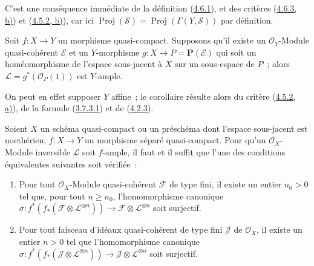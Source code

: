 C'est une conséquence immédiate de la définition
(\hyperref[II.4.6.1-fr]{4.6.1}), et des critères
(\hyperref[II.4.6.3-fr]{4.6.3, b)}) et
(\hyperref[II.4.5.2-fr]{4.5.2, b)}), car ici
$\operatorname{Proj}(\mathcal{S})
=\operatorname{Proj}(\Gamma(Y,\mathcal{S}))$ par définition.

\begin{corollary}[4.6.7]
\label{II.4.6.7-fr}
Soit $f:X\to Y$ un morphisme quasi-compact. Supposons qu'il existe un
$\mathcal{O}_Y$-Module quasi-cohérent $\mathcal{E}$ et un $Y$-morphisme
$g:X\to P=\mathbf{P}(\mathcal{E})$ qui soit un homéomorphisme de l'espace
sous-jacent à $X$ sur un sous-espace de $P$~; alors
$\mathcal{L}=g^*(\mathcal{O}_P(1))$ est $Y$-ample.
\end{corollary}

On peut en effet supposer $Y$ affine~; le corollaire résulte alors du
critère (\hyperref[II.4.5.2-fr]{4.5.2, a)}), de la formule
(\hyperref[II.3.7.3.1-fr]{3.7.3.1}) et de
(\hyperref[II.4.2.3-fr]{4.2.3}).

\begin{proposition}[4.6.8]
\label{II.4.6.8-fr}
Soient $X$ un schéma quasi-compact ou un préschéma dont l'espace
sous-jacent est noethérien, $f:X\to Y$ un morphisme séparé quasi-compact.
Pour qu'un $\mathcal{O}_X$-Module inversible $\mathcal{L}$ soit $f$-ample,
il faut et il suffit que l'une des conditions équivalentes suivantes soit
vérifiée~:
\begin{enumerate}
  \item[\rm{c)}] Pour tout $\mathcal{O}_X$-Module quasi-cohérent
  $\mathcal{F}$ de type fini, il existe un entier $n_0>0$ tel que, pour
  tout $n\geq n_0$, l'homomorphisme canonique
  $\sigma:f^*(f_*(\mathcal{F}\otimes\mathcal{L}^{\otimes n}))\to
  \mathcal{F}\otimes\mathcal{L}^{\otimes n}$ soit surjectif.
  \item[\rm{c')}] Pour tout faisceau d'idéaux quasi-cohérent de type fini
  $\mathcal{J}$ de $\mathcal{O}_X$, il existe un entier $n>0$ tel que
  l'homomorphisme canonique
  $\sigma:f^*(f_*(\mathcal{J}\otimes\mathcal{L}^{\otimes n}))\to
  \mathcal{J}\otimes\mathcal{L}^{\otimes n}$ soit surjectif.
\end{enumerate}
\end{proposition}

